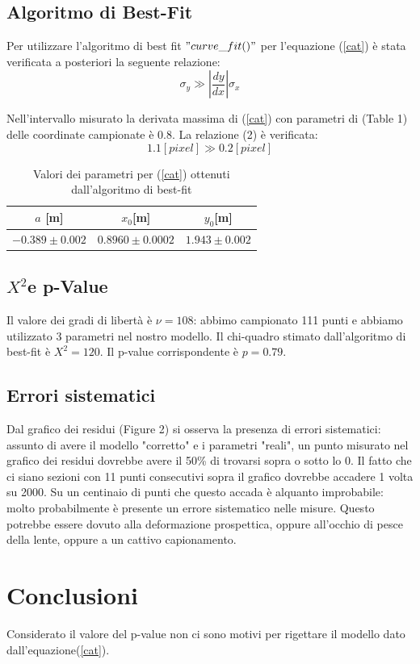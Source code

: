 \documentclass{article}
\begin{document}
\subsection{Algoritmo di Best-Fit}
Per utilizzare l'algoritmo di best fit $"curve\_fit()"$ per l'equazione (\ref{cat}) è stata verificata a posteriori la seguente relazione:
\begin{equation}
\sigma_{y} \gg \left| \frac{dy}{dx} \right| \sigma_{x}
\end{equation}

Nell'intervallo misurato la derivata massima di  (\ref{cat}) con parametri di (Table 1)  delle coordinate campionate è 0.8. 
La relazione (2) è verificata:
\begin{equation}
1.1 [pixel] \gg 0.2[pixel]
\end{equation}


\begin{table}
\centering
	\begin{tabular}{|c|c|c|}

	\hline
		$a$ [m] & $x_0$[m] & $y_0$[m]\\
	\hline
	
		$-0.389\pm0.002$ & $0.8960\pm0.0002$ & $1.943\pm0.002$\\
	\hline
	
	\end{tabular}
	\caption{Valori dei parametri per (\ref{cat}) ottenuti dall'algoritmo di best-fit}
	
\end{table}


\subsection{$X^2$e p-Value}
Il valore dei gradi di libertà è $\nu=108$: abbimo campionato 111 punti e abbiamo utilizzato 3 parametri nel nostro modello. 
Il chi-quadro stimato dall'algoritmo di best-fit è $X^2=120$.
Il p-value corrispondente è $p=0.79$.

\subsection{Errori sistematici}
Dal grafico dei residui (Figure 2) si osserva la presenza di errori sistematici: assunto di avere il modello "corretto" e i parametri "reali", un punto misurato nel grafico dei residui dovrebbe avere il 50\% di trovarsi sopra o sotto lo 0.
Il fatto che ci siano sezioni con 11 punti consecutivi sopra il grafico dovrebbe accadere 1 volta su 2000.  Su un centinaio di punti che questo accada è alquanto improbabile: molto probabilmente è presente un errore sistematico nelle misure. 
Questo potrebbe essere dovuto alla deformazione prospettica, oppure  all'occhio di pesce della lente, oppure a un cattivo capionamento. 

\section{Conclusioni}
Considerato il valore del p-value non ci sono motivi per rigettare il modello dato dall'equazione(\ref{cat}).
\end{document}
